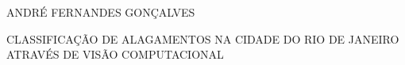\cleardoublepage


\pagestyle{ruledheader}
\setcounter{page}{1}

\cleardoublepage
\thispagestyle{empty}

\vspace{-60mm}

\begin{center}
   {\large ANDRÉ FERNANDES GONÇALVES}\\
   \vspace{7mm}

   \uppercase{Classificação de Alagamentos na Cidade do Rio de Janeiro através de Visão Computacional}\\
  \vspace{10mm}
\end{center}

